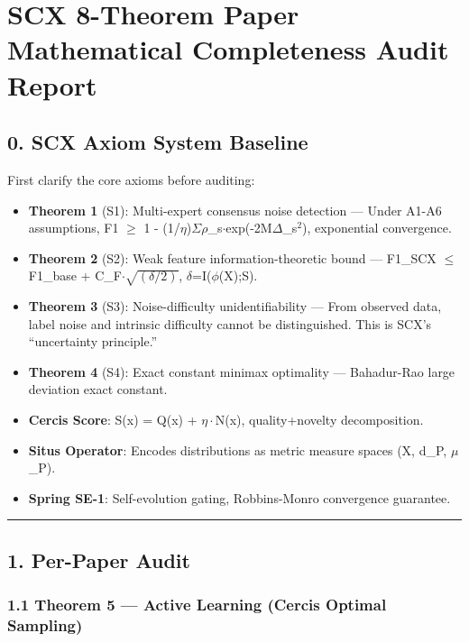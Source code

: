 \documentclass[
  12pt,
]{article}
\author{SCX}
\date{2026}
\providecommand{\tightlist}{%
  \setlength{\itemsep}{0pt}\setlength{\parskip}{0pt}}
\begin{document}
\section{SCX 8-Theorem Paper Mathematical Completeness Audit Report}\label{scx-8-theorem-audit}

\subsection{0. SCX Axiom System Baseline}\label{scx-axiom-baseline}

First clarify the core axioms before auditing:

\begin{itemize}
\tightlist
\item
  \textbf{Theorem 1} (S1): Multi-expert consensus noise detection --- Under A1-A6 assumptions, F1 $\geq$ 1 - (1/$\eta$)$\Sigma$$\rho$\_s$\cdot$exp(-2M$\Delta$\_s$^2$), exponential convergence.
\item
  \textbf{Theorem 2} (S2): Weak feature information-theoretic bound --- F1\_SCX $\leq$ F1\_base + C\_F$\cdot\sqrt{(\delta/2)}$, $\delta$=I($\phi$(X);S).
\item
  \textbf{Theorem 3} (S3): Noise-difficulty unidentifiability --- From observed data, label noise and intrinsic difficulty cannot be distinguished. This is SCX's ``uncertainty principle.''
\item
  \textbf{Theorem 4} (S4): Exact constant minimax optimality --- Bahadur-Rao large deviation exact constant.
\item
  \textbf{Cercis Score}: S(x) = Q(x) + $\eta\cdot$N(x), quality+novelty decomposition.
\item
  \textbf{Situs Operator}: Encodes distributions as metric measure spaces (X, d\_P, $\mu$\_P).
\item
  \textbf{Spring SE-1}: Self-evolution gating, Robbins-Monro convergence guarantee.
\end{itemize}

\begin{center}\rule{0.5\linewidth}{0.5pt}\end{center}

\subsection{1. Per-Paper Audit}\label{per-paper-audit}

\subsubsection{1.1 Theorem 5 --- Active Learning (Cercis Optimal Sampling)}\label{theorem-5-active-learning}
\end{document}
